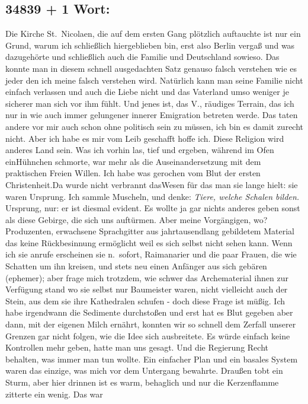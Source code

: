 \documentclass[
]{article}
\author{}
\date{\vspace{-2.5em}}
\begin{document}
\subsection{34839 + 1 Wort:}\label{wort}

Die Kirche St.~Nicolaen, die auf dem ersten Gang plötzlich auftauchte
ist nur ein Grund, warum ich schließlich hiergeblieben bin, erst also
Berlin vergaß und was dazugehörte und schließlich auch die Familie und
Deutschland sowieso. Das konnte man in diesem schnell ausgedachten Satz
genauso falsch verstehen wie es jeder den ich meine falsch verstehen
wird. Natürlich kann man seine Familie nicht einfach verlassen und auch
die Liebe nicht und das Vaterland umso weniger je sicherer man sich vor
ihm fühlt. Und jenes ist, das V., räudiges Terrain, das ich nur in wie
auch immer gelungener innerer Emigration betreten werde. Das taten
andere vor mir auch schon ohne politisch sein zu müssen, ich bin es
damit zurecht nicht. Aber ich habe es mir vom Leib geschafft hoffe ich.
Diese Religion wird anderes Land sein. Was ich vorhin las, tief und
ergeben, während im Ofen einHühnchen schmorte, war mehr als die
Auseinandersetzung mit dem praktischen Freien Willen. Ich habe was
gerochen vom Blut der ersten Christenheit.Da wurde nicht verbrannt
dasWesen für das man sie lange hielt: sie waren Ursprung. Ich sammle
Muscheln, und denke: \emph{Tiere, welche Schalen bilden.} Ursprung, nur:
er ist diesmal evident. Es wollte ja gar nichts anderes geben sonst als
diese Gebirge, die sich uns auftürmen. Aber meine Vorgängigen, wo?
Produzenten, erwachsene Sprachgitter aus jahrtausendlang gebildetem
Material das keine Rückbesinnung ermöglicht weil es sich selbst nicht
sehen kann. Wenn ich sie anrufe erscheinen sie n.~sofort, Raimanarier
und die paar Frauen, die wie Schatten um ihn kreisen, und stets neu
einen Anfänger aus sich gebären (ephemer); aber frage mich trotzdem, wie
schwer das Archematerial ihnen zur Verfügung stand wo sie selbst nur
Baumeister waren, nicht vielleicht auch der Stein, aus dem sie ihre
Kathedralen schufen - doch diese Frage ist müßig. Ich habe irgendwann
die Sedimente durchstoßen und erst hat es Blut gegeben aber dann, mit
der eigenen Milch ernährt, konnten wir so schnell dem Zerfall unserer
Grenzen gar nicht folgen, wie die Idee sich ausbreitete. Es würde
einfach keine Kontrollen mehr geben, hatte man uns gesagt. Und die
Regierung Recht behalten, was immer man tun wollte. Ein einfacher Plan
und ein basales System waren das einzige, was mich vor dem Untergang
bewahrte. Draußen tobt ein Sturm, aber hier drinnen ist es warm,
behaglich und nur die Kerzenflamme zitterte ein wenig. Das war
\end{document}
